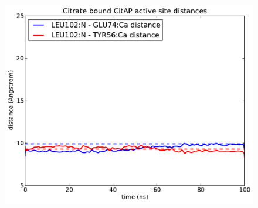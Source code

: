 \documentclass[english]{beamer}
\begin{document}
\begin{frame}
\begin{columns}[t]
        \begin{figure}
            \includegraphics[width=1.0\textwidth]{figures/CitAP_opening/CitAP_dist_bound.pdf}
        \end{figure}        

    \end{columns} 


\end{frame}    

\end{document}
